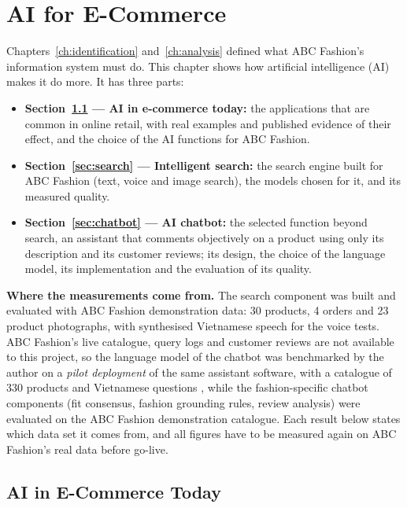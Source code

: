 \chapter{AI for E-Commerce}
\label{ch:ai}

Chapters~\ref{ch:identification} and~\ref{ch:analysis} defined what ABC Fashion's information system must do. This chapter shows how artificial intelligence (AI) makes it do more. It has three parts:
\begin{itemize}
  \item \textbf{Section~\ref{sec:aitoday} --- AI in e-commerce today:} the applications that are common in online retail, with real examples and published evidence of their effect, and the choice of the AI functions for ABC Fashion.
  \item \textbf{Section~\ref{sec:search} --- Intelligent search:} the search engine built for ABC Fashion (text, voice and image search), the models chosen for it, and its measured quality.
  \item \textbf{Section~\ref{sec:chatbot} --- AI chatbot:} the selected function beyond search, an assistant that comments objectively on a product using only its description and its customer reviews; its design, the choice of the language model, its implementation and the evaluation of its quality.
\end{itemize}

\textbf{Where the measurements come from.} The search component was built and evaluated with ABC Fashion demonstration data: 30 products, 4 orders and 23 product photographs, with synthesised Vietnamese speech for the voice tests. ABC Fashion's live catalogue, query logs and customer reviews are not available to this project, so the language model of the chatbot was benchmarked by the author on a \emph{pilot deployment} of the same assistant software, with a catalogue of 330 products and Vietnamese questions \cite{pilot}, while the fashion-specific chatbot components (fit consensus, fashion grounding rules, review analysis) were evaluated on the ABC Fashion demonstration catalogue. Each result below states which data set it comes from, and all figures have to be measured again on ABC Fashion's real data before go-live.

\section{AI in E-Commerce Today}
\label{sec:aitoday}

